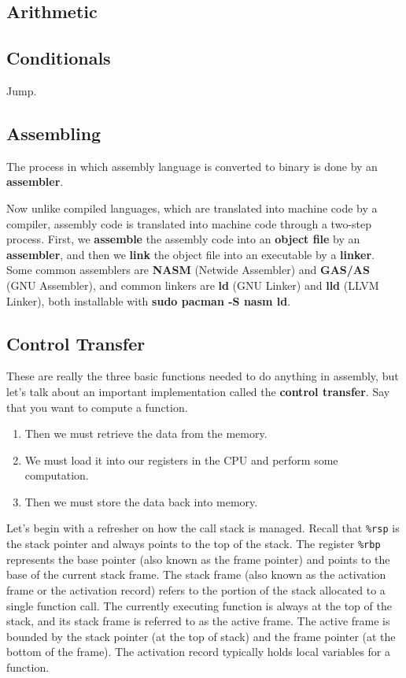 \subsection{Arithmetic}

\subsection{Conditionals} 

  Jump. 

\subsection{Assembling}

  The process in which assembly language is converted to binary is done by an \textbf{assembler}. 

  Now unlike compiled languages, which are translated into machine code by a compiler, assembly code is translated into machine code through a two-step process. First, we \textbf{assemble} the assembly code into an \textbf{object file} by an \textbf{assembler}, and then we \textbf{link} the object file into an executable by a \textbf{linker}. Some common assemblers are \textbf{NASM} (Netwide Assembler) and \textbf{GAS/AS} (GNU Assembler), and common linkers are \textbf{ld} (GNU Linker) and \textbf{lld} (LLVM Linker), both installable with \textbf{sudo pacman -S nasm ld}. 

\subsection{Control Transfer}

  These are really the three basic functions needed to do anything in assembly, but let's talk about an important implementation called the \textbf{control transfer}. Say that you want to compute a function. 
  \begin{enumerate}
    \item Then we must retrieve the data from the memory. 
    \item We must load it into our registers in the CPU and perform some computation. 
    \item Then we must store the data back into memory. 
  \end{enumerate}

  Let’s begin with a refresher on how the call stack is managed. Recall that \texttt{\%rsp} is the stack pointer and always points to the top of the stack. The register \texttt{\%rbp} represents the base pointer (also known as the frame pointer) and points to the base of the current stack frame. The stack frame (also known as the activation frame or the activation record) refers to the portion of the stack allocated to a single function call. The currently executing function is always at the top of the stack, and its stack frame is referred to as the active frame. The active frame is bounded by the stack pointer (at the top of stack) and the frame pointer (at the bottom of the frame). The activation record typically holds local variables for a function.

